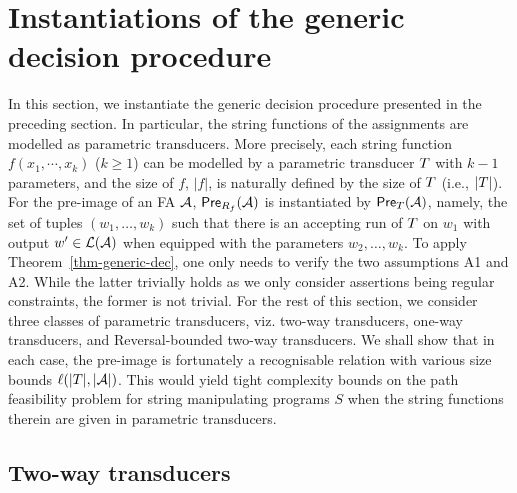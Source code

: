 
\section{Instantiations of the generic decision procedure}\label{sec-instan}

In this section, we instantiate the generic decision procedure presented in the preceding section. In particular, the string functions of the assignments are modelled as parametric transducers. More precisely, each string function $f(x_1, \cdots, x_k)$ ($k\geq 1$) can be modelled by a parametric transducer $T$  
with $k-1$ parameters, and the size of $f$, $|f|$, is naturally defined by the size of $T$ (i.e., $|T|$). For the pre-image of an FA $\mathcal{A}$,  $\textsf{Pre}_{R_f}(\mathcal{A})$ is instantiated by $\textsf{Pre}_{T}(\mathcal{A})$, namely, the set of tuples $(w_1,\ldots, w_k)$ such that there is an accepting run of $T$ on $w_1$ with output $w'\in \mathcal{L}(\mathcal{A})$ when equipped with the parameters $w_2,\ldots, w_k$. To apply Theorem~\ref{thm-generic-dec}, one only needs to verify the two assumptions A1 and A2. While the latter trivially holds as we only consider assertions being regular constraints, the former is not trivial. For the rest of this section, we consider three classes of parametric transducers, viz. two-way transducers, one-way transducers, and Reversal-bounded two-way transducers. We shall show that in each case, the pre-image is fortunately a recognisable relation with various size bounds $\ell(|T|, |\mathcal{A}|)$. This would yield tight complexity bounds on the path feasibility problem for string manipulating programs $S$ when the string functions therein are given in parametric transducers.  



 
\subsection{Two-way transducers}\label{sec-2way}



